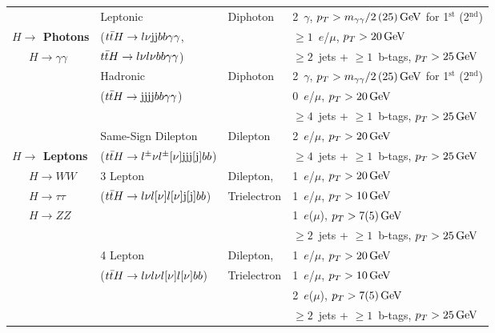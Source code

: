 \begin{table}[H]
\begin{center}
{\begin{tabular}{|l|l|l|l|}
\hline
& Leptonic           & Diphoton      & 2\ $ \gamma $, $ p_T  > m_{ \gamma  \gamma }/2\,(25) \,\mathrm{GeV}$ for 1$^{\mathrm{st}}$ (2$^{\mathrm{nd}}$) \\
{\bf \boldmath$ H  \rightarrow  $ Photons} & ($t\bar{t}  H  \rightarrow   l    \nu \mathrm{jj}  b  b  \gamma   \gamma $, & & $\geq 1$\ $ e $/$ \mu $, $ p_T  > 20 \,\mathrm{GeV}$ \\
\ \ \ $ H  \rightarrow   \gamma   \gamma $       &  $t\bar{t}  H  \rightarrow   l    \nu  l    \nu  b  b   \gamma   \gamma $)& & $\geq 2$\ jets + $\geq 1$\ b-tags, $ p_T  > 25 \,\mathrm{GeV}$ \\
\cline{2-4}
& Hadronic           & Diphoton      & 2\ $ \gamma $, $ p_T  > m_{ \gamma  \gamma }/2\,(25) \,\mathrm{GeV}$ for 1$^{\mathrm{st}}$ (2$^{\mathrm{nd}}$) \\
& ($t\bar{t}  H  \rightarrow  \mathrm{jj} \mathrm{jj}  b  b  \gamma   \gamma $)& & 0\ $ e $/$ \mu $, $ p_T  > 20 \,\mathrm{GeV}$ \\
&                    &               & $\geq 4$\ jets + $\geq 1$\ b-tags, $ p_T  > 25 \,\mathrm{GeV}$ \\
\hline
& Same-Sign Dilepton & Dilepton      & 2\ $ e $/$ \mu $, $ p_T  > 20 \,\mathrm{GeV}$  \\
{\bf \boldmath $ H  \rightarrow  $ Leptons} & ($t\bar{t}  H  \rightarrow   l ^\pm   \nu  l ^\pm [  \nu] \mathrm{jjj[j]}  b  b $) & & $\geq 4$\ jets + $\geq 1$\ b-tags, $ p_T  > 25 \,\mathrm{GeV}$ \\
\cline{2-4}
\ \ \ $ H  \rightarrow   W  W $          & 3 Lepton           & Dilepton,     & 1\ $ e $/$ \mu $, $ p_T  > 20 \,\mathrm{GeV}$  \\
\ \ \ $ H  \rightarrow   \tau  \tau $        & ($t\bar{t}  H  \rightarrow   l    \nu  l  [  \nu]  l  [  \nu] \mathrm{j[j]}  b  b $)&  Trielectron & 1\ $ e $/$ \mu $, $ p_T  > 10 \,\mathrm{GeV}$  \\
\ \ \ $ H  \rightarrow   Z  Z $        &                    &               & 1\ $ e $($ \mu $), $ p_T  > 7(5) \,\mathrm{GeV}$  \\
&                    &               & $\geq 2$\ jets + $\geq 1$\ b-tags, $ p_T  > 25 \,\mathrm{GeV}$ \\
\cline{2-4}
& 4 Lepton           & Dilepton,     & 1\ $ e $/$ \mu $, $ p_T  > 20 \,\mathrm{GeV}$  \\
& ($t\bar{t}  H  \rightarrow   l    \nu  l    \nu  l  [  \nu]  l  [  \nu]  b  b $) &  Trielectron & 1\ $ e $/$ \mu $, $ p_T  > 10 \,\mathrm{GeV}$  \\
&                    &               & 2\ $ e $($ \mu $), $ p_T  > 7(5) \,\mathrm{GeV}$  \\
&                    &               & $\geq 2$\ jets + $\geq 1$\ b-tags, $ p_T  > 25 \,\mathrm{GeV}$ \\
\hline
\end{tabular}
}
\end{center}
\end{table}
